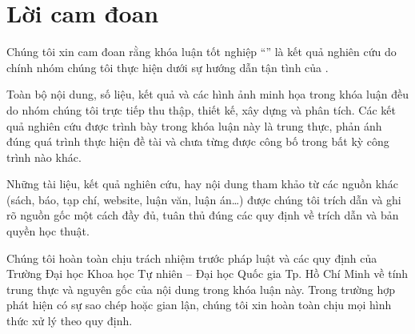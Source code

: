 \chapter*{Lời cam đoan}

Chúng tôi xin cam đoan rằng khóa luận tốt nghiệp ``\thesisname'' là kết quả nghiên cứu do chính nhóm chúng tôi thực hiện dưới sự hướng dẫn tận tình của \advisorfulltitle.

Toàn bộ nội dung, số liệu, kết quả và các hình ảnh minh họa trong khóa luận đều do nhóm chúng tôi trực tiếp thu thập, thiết kế, xây dựng và phân tích. 
Các kết quả nghiên cứu được trình bày trong khóa luận này là trung thực, phản ánh đúng quá trình thực hiện đề tài và chưa từng được công bố trong bất kỳ công trình nào khác.

Những tài liệu, kết quả nghiên cứu, hay nội dung tham khảo từ các nguồn khác (sách, báo, tạp chí, website, luận văn, luận án\dots) được chúng tôi trích dẫn và ghi rõ nguồn gốc một cách đầy đủ, tuân thủ đúng các quy định về trích dẫn và bản quyền học thuật.

Chúng tôi hoàn toàn chịu trách nhiệm trước pháp luật và các quy định của Trường Đại học Khoa học Tự nhiên -- Đại học Quốc gia Tp. Hồ Chí Minh về tính trung thực và nguyên gốc của nội dung trong khóa luận này. Trong trường hợp phát hiện có sự sao chép hoặc gian lận, chúng tôi xin hoàn toàn chịu mọi hình thức xử lý theo quy định.